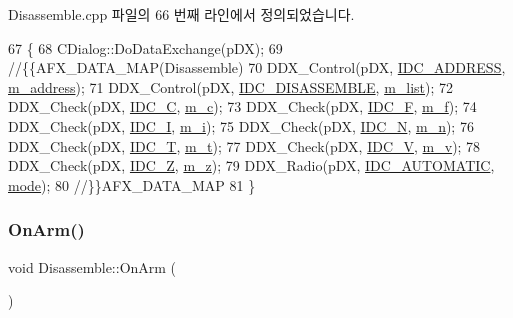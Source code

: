 Disassemble.\+cpp 파일의 66 번째 라인에서 정의되었습니다.


\begin{DoxyCode}
67 \{
68   CDialog::DoDataExchange(pDX);
69   \textcolor{comment}{//\{\{AFX\_DATA\_MAP(Disassemble)}
70   DDX\_Control(pDX, \mbox{\hyperlink{resource_8h_af0726d27cf7b7070867a81fde283a218}{IDC\_ADDRESS}}, \mbox{\hyperlink{class_disassemble_a74582f94dacc9f2eac347fd59b2a906b}{m\_address}});
71   DDX\_Control(pDX, \mbox{\hyperlink{resource_8h_a1e77bc2c6285101b4f86fb554e60299c}{IDC\_DISASSEMBLE}}, \mbox{\hyperlink{class_disassemble_a99205259bac8d57ff61ca23458f76634}{m\_list}});
72   DDX\_Check(pDX, \mbox{\hyperlink{resource_8h_a03060b66d7605871c04bec4173831ab7}{IDC\_C}}, \mbox{\hyperlink{class_disassemble_aa38e1a7ec55e3fbe47d067e3a46df422}{m\_c}});
73   DDX\_Check(pDX, \mbox{\hyperlink{resource_8h_a4933b03b799290719b440545d60b3bce}{IDC\_F}}, \mbox{\hyperlink{class_disassemble_aca528eed73b34340d601b725dd688b07}{m\_f}});
74   DDX\_Check(pDX, \mbox{\hyperlink{resource_8h_a16321ebeb5a839454048c84aed178048}{IDC\_I}}, \mbox{\hyperlink{class_disassemble_a6b51f716f8d8513da506a1d7875ca500}{m\_i}});
75   DDX\_Check(pDX, \mbox{\hyperlink{resource_8h_a38206af99e79e574c7d61741824783aa}{IDC\_N}}, \mbox{\hyperlink{class_disassemble_ae8c58060e32c1b456fea8c047052a746}{m\_n}});
76   DDX\_Check(pDX, \mbox{\hyperlink{resource_8h_a6c2ccbd7d9b61380a081cff7c69d84d1}{IDC\_T}}, \mbox{\hyperlink{class_disassemble_a477510b19843360a883717917f387412}{m\_t}});
77   DDX\_Check(pDX, \mbox{\hyperlink{resource_8h_a9a7fcc5553822abe222f3b64a67b3475}{IDC\_V}}, \mbox{\hyperlink{class_disassemble_ac8fad0495b1da26907516e83c876ec08}{m\_v}});
78   DDX\_Check(pDX, \mbox{\hyperlink{resource_8h_a1c7d666c64cc5fe574706f800edacc1e}{IDC\_Z}}, \mbox{\hyperlink{class_disassemble_ac4b4e68b91013731333b3019bbc16f1d}{m\_z}});
79   DDX\_Radio(pDX, \mbox{\hyperlink{resource_8h_afabb7acda2418542f4f020e4e2f75bf6}{IDC\_AUTOMATIC}}, \mbox{\hyperlink{class_disassemble_a30b707e1da3b01abda044e78929404cc}{mode}});
80   \textcolor{comment}{//\}\}AFX\_DATA\_MAP}
81 \}
\end{DoxyCode}
\mbox{\label{class_disassemble_a11695fe0ce9003a5cfcd58e86ad6047e}} 
\subsubsection{\texorpdfstring{On\+Arm()}{OnArm()}}
{\footnotesize\ttfamily void Disassemble\+::\+On\+Arm (\begin{DoxyParamCaption}{ }\end{DoxyParamCaption})\hspace{0.3cm}{\ttfamily [protected]}}



